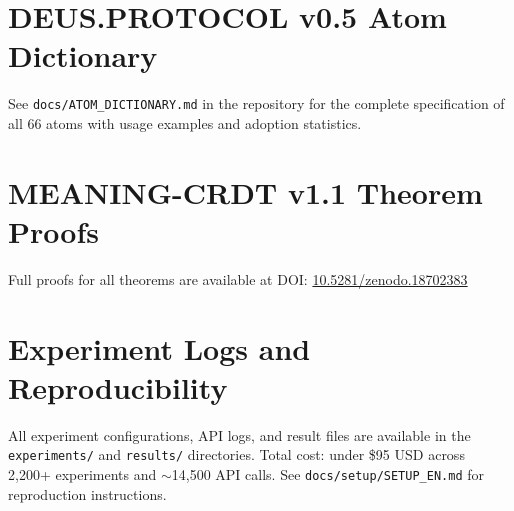 \documentclass[11pt,a4paper]{article}
\begin{document}



\appendix
\section{DEUS.PROTOCOL v0.5 Atom Dictionary}

See \texttt{docs/ATOM\_DICTIONARY.md} in the repository for the
complete specification of all 66 atoms with usage examples and
adoption statistics.

\section{MEANING-CRDT v1.1 Theorem Proofs}

Full proofs for all theorems are available at DOI:
\href{https://doi.org/10.5281/zenodo.18702383}{10.5281/zenodo.18702383}

\section{Experiment Logs and Reproducibility}

All experiment configurations, API logs, and result files are available
in the \texttt{experiments/} and \texttt{results/} directories.
Total cost: under \$95 USD across 2,200+ experiments and
$\sim$14,500 API calls.
See \texttt{docs/setup/SETUP\_EN.md} for reproduction instructions.
\end{document}
